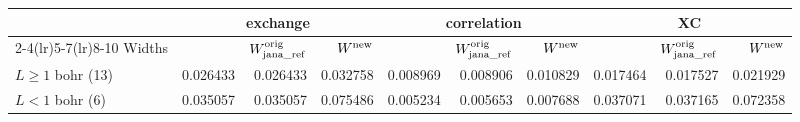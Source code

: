 \begin{tabular}{@{}l rrr rrr rrr@{}}
\toprule
 & \multicolumn{3}{c}{exchange} & \multicolumn{3}{c}{correlation} & \multicolumn{3}{c}{XC} \\
\cmidrule(lr){2-4}\cmidrule(lr){5-7}\cmidrule(lr){8-10}
Widths & \janaref{} & $W^{\rm orig}_{\rm jana\_ref}$ & $W^{\rm new}$ & \janaref{} & $W^{\rm orig}_{\rm jana\_ref}$ & $W^{\rm new}$ & \janaref{} & $W^{\rm orig}_{\rm jana\_ref}$ & $W^{\rm new}$ \\
\midrule
$L\geq1$ bohr (13) & 0.026433 & \textcolor{pyscfred}{0.026433} & \textcolor{pyscfred}{0.032758} & 0.008969 & \textcolor{pyscfred}{0.008906} & \textcolor{pyscfred}{0.010829} & 0.017464 & \textcolor{pyscfred}{0.017527} & \textcolor{pyscfred}{0.021929} \\
$L<1$ bohr (6) & 0.035057 & \textcolor{pyscfred}{0.035057} & \textcolor{pyscfred}{0.075486} & 0.005234 & \textcolor{pyscfred}{0.005653} & \textcolor{pyscfred}{0.007688} & 0.037071 & \textcolor{pyscfred}{0.037165} & \textcolor{pyscfred}{0.072358} \\
\bottomrule
\end{tabular}
